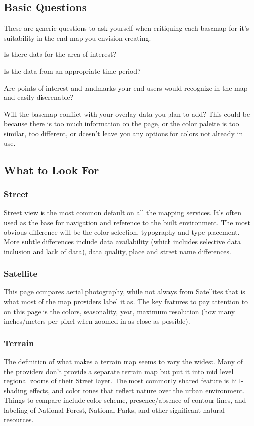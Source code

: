 \documentclass[12pt,letterpaper]{article}
\begin{document}
\subsection{Basic Questions}
These are generic questions to ask yourself when critiquing each basemap for it's suitability in the end map you envision creating.
\item Is there data for the area of interest?
\item Is the data from an appropriate time period?
\item Are points of interest and landmarks your end users would recognize in the map and easily discrenable?
\item Will the basemap conflict with your overlay data you plan to add? This could be because there is too much information on the page, or the color palette is too similar, too different, or doesn't leave you any options for colors not already in use.

\subsection{What to Look For}
\subsubsection{Street}
Street view is the most common default on all the mapping services. It's often used as the base for navigation and reference to the built environment. The most obvious difference will be the color selection, typography and type placement. More subtle differences include data availability (which includes selective data inclusion and lack of data), data quality, place and street name differences.  

\subsubsection{Satellite}
This page compares aerial photography, while not always from Satellites that is what most of the map providers label it as. The key features to pay attention to on this page is the colors, seasonality, year, maximum resolution (how many inches/meters per pixel when zoomed in as close as possible).

\subsubsection{Terrain}
The definition of what makes a terrain map seems to vary the widest. Many of the providers don't provide a separate terrain map but put it into mid level regional zooms of their Street layer. The most commonly shared feature is hill-shading effects, and color tones that reflect nature over the urban environment. Things to compare include color scheme, presence/absence of contour lines, and labeling of National Forest, National Parks, and other significant natural resources.
\end{document}
